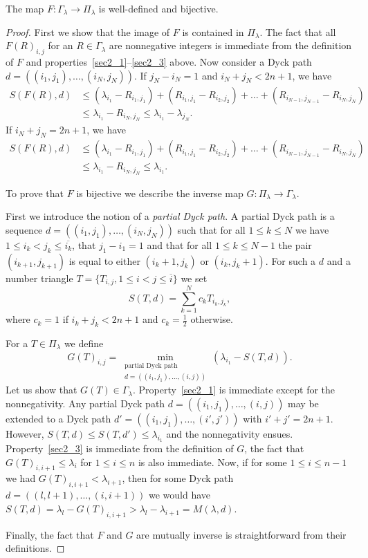 \documentclass[ALCO,ThmDefs,Unicode]{cedram}
\newcommand{\la}{\lambda}
\begin{document}
\begin{theo}
The map $F:\Gamma_\la\to\Pi_\la$ is well-defined and bijective.
\end{theo}
\begin{proof}
First we show that the image of $F$ is contained in $\Pi_\lambda$. The fact that all $F(R)_{i,j}$ for an $R\in\Gamma_\la$ are nonnegative integers is immediate from the definition of $F$ and properties~\eqref{sec2_1}--\eqref{sec2_3} above. Now consider a Dyck path $d=((i_1,j_1),\dots,(i_N,j_N))$. If $j_N-i_N=1$ and $i_N+j_N<2n+1$, we have
\begin{align*}
S(F(R),d)&\le (\la_{i_1}-R_{i_1,j_1})+(R_{i_1,j_1}-R_{i_2,j_2})+\dots+(R_{i_{N-1},j_{N-1}}-R_{i_N,j_N})\\ 
&\le \la_{i_1}-R_{i_N,j_N}\le\la_{i_1}-\la_{j_N}.
\end{align*}
If $i_N+j_N=2n+1$, we have
\begin{align*}
S(F(R),d)&\le (\la_{i_1}-R_{i_1,j_1})+(R_{i_1,j_1}-R_{i_2,j_2})+\dots+(R_{i_{N-1},j_{N-1}}-R_{i_N,j_N})\\
&\le \la_{i_1}-R_{i_N,j_N}\le\la_{i_1}.
\end{align*}

To prove that $F$ is bijective we describe the inverse map $G:\Pi_\la\to\Gamma_\la$.

First we introduce the notion of a \emph{partial Dyck path}. A partial Dyck path is a sequence $d=((i_1,j_1),\dots,(i_N,j_N))$ such that for all $1\le k\le N$ we have $1\le i_k<j_k\le \overline{i_k}$, that $j_1-i_1=1$ and that for all $1\le k\le N-1$ the pair $(i_{k+1},j_{k+1})$ is equal to either $(i_k+1,j_k)$ or $(i_k,j_k+1)$. For such a $d$ and a number triangle $T=\{T_{i,j},1\le i<j\le \overline i\}$ we set
\[
S(T,d)=\sum_{k=1}^N c_k T_{i_k,j_k},
\]
where $c_k=1$ if $i_k+j_k<2n+1$ and $c_k=\frac12$ otherwise.

For a $T\in\Pi_\la$ we define
\[
G(T)_{i,j}=\min\limits_{\substack{\text{partial Dyck path}\\d=((i_1,j_1),\dots,(i,j))}}(\la_{i_1}-S(T,d)).
\]
Let us show that $G(T)\in\Gamma_\la$. Property~\eqref{sec2_1} is immediate except for the nonnegativity. Any partial Dyck path $d=((i_1,j_1),\dots,(i,j))$ may be extended to a Dyck path $d'=((i_1,j_1),\dots,(i',j'))$ with $i'+j'=2n+1$. However, $S(T,d)\le S(T,d')\le\la_{i_1}$ and the nonnegativity ensues. Property~\eqref{sec2_3} is immediate from the definition of $G$, the fact that $G(T)_{i,i+1}\le\la_i$ for $1\le i\le n$ is also immediate. Now, if for some $1\le i\le n-1$ we had $G(T)_{i,i+1}<\la_{i+1}$, then for some Dyck path $d=((l,l+1),\dots,(i,i+1))$ we would have $S(T,d)=\la_l-G(T)_{i,i+1}>\la_l-\la_{i+1}=M(\la,d)$.

Finally, the fact that $F$ and $G$ are mutually inverse is straightforward from their definitions.
\end{proof}
\end{document}
